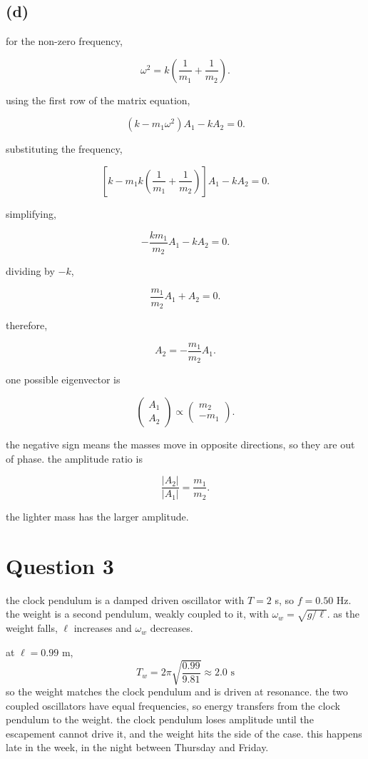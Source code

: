 \documentclass{article}
\begin{document}
\subsection*{(d)}

for the non-zero frequency,

\[
\omega^2=k\left(\frac{1}{m_1}+\frac{1}{m_2}\right).
\]

using the first row of the matrix equation,

\[
(k-m_1\omega^2)A_1-kA_2=0.
\]

substituting the frequency,

\[
\left[k-m_1k\left(\frac{1}{m_1}+\frac{1}{m_2}\right)\right]A_1-kA_2=0.
\]

simplifying,

\[
-\frac{km_1}{m_2}A_1-kA_2=0.
\]

dividing by $-k$,

\[
\frac{m_1}{m_2}A_1+A_2=0.
\]

therefore,

\[
A_2=-\frac{m_1}{m_2}A_1.
\]

one possible eigenvector is

\[
\boxed{
\begin{pmatrix}
A_1\\
A_2
\end{pmatrix}
\propto
\begin{pmatrix}
m_2\\
-m_1
\end{pmatrix}
}.
\]

the negative sign means the masses move in opposite directions, so they are out of phase. the amplitude ratio is

\[
\boxed{\frac{|A_2|}{|A_1|}=\frac{m_1}{m_2}}.
\]

the lighter mass has the larger amplitude.

\section*{Question 3}

the clock pendulum is a damped driven oscillator with $T = 2$ s, so $f = 0.50$ Hz. the weight is a second pendulum, weakly coupled to it, with $\omega_w = \sqrt{g/\ell}$. as the weight falls, $\ell$ increases and $\omega_w$ decreases.

at $\ell = 0.99$ m,
\[
T_w = 2\pi\sqrt{\frac{0.99}{9.81}} \approx 2.0 \text{ s}
\]
so the weight matches the clock pendulum and is driven at resonance. the two coupled oscillators have equal frequencies, so energy transfers from the clock pendulum to the weight. the clock pendulum loses amplitude until the escapement cannot drive it, and the weight hits the side of the case. this happens late in the week, in the night between Thursday and Friday.
\end{document}
